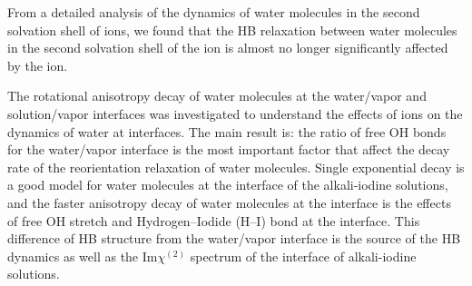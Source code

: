 
From a detailed analysis of the dynamics of water molecules in the second solvation shell of ions, 
we found that the HB relaxation between water molecules in the second solvation shell of the ion is almost
no longer significantly affected by the ion.

The rotational anisotropy decay of water molecules at the water/vapor and solution/vapor interfaces was investigated to
understand the effects of ions on the dynamics of water at interfaces.
The main result is: the ratio of free OH bonds for the water/vapor interface is the most important factor 
that affect the decay rate of the reorientation relaxation of water molecules.
Single exponential decay is a good model for water molecules at the interface of the alkali-iodine solutions,
and the faster anisotropy decay of water molecules at the interface is the effects of free OH stretch and Hydrogen--Iodide (H--I) bond at the interface.
This difference of HB structure from the water/vapor interface is the source of 
the HB dynamics as well as the Im$\chi^{(2)}$ spectrum of the interface of alkali-iodine solutions.  
